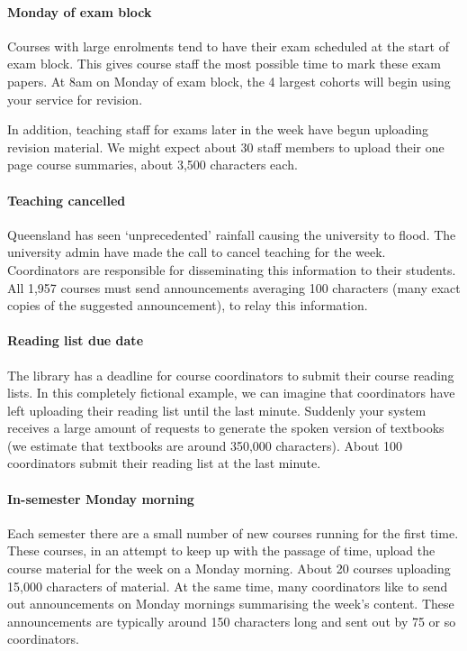 \documentclass{csse4400}
\begin{document}
\paragraph{Monday of exam block}
Courses with large enrolments tend to have their exam scheduled at the start of exam block.
This gives course staff the most possible time to mark these exam papers.
At 8am on Monday of exam block,
the 4 largest cohorts will begin using your service for revision.

In addition, teaching staff for exams later in the week have begun uploading revision material.
We might expect about 30 staff members to upload their one page course summaries,
about 3,500 characters each.

\paragraph{Teaching cancelled}
Queensland has seen `unprecedented' rainfall causing the university to flood.
The university admin have made the call to cancel teaching for the week.
Coordinators are responsible for disseminating this information to their students.
All 1,957 courses must send announcements averaging 100 characters (many exact copies of the suggested announcement),
to relay this information.

\paragraph{Reading list due date}
The library has a deadline for course coordinators to submit their course reading lists.
In this completely fictional example,
we can imagine that coordinators have left uploading their reading list until the last minute.
Suddenly your system receives a large amount of requests to generate the spoken version of textbooks (we estimate that textbooks are around 350,000 characters).
About 100 coordinators submit their reading list at the last minute.

\paragraph{In-semester Monday morning}
Each semester there are a small number of new courses running for the first time.
These courses, in an attempt to keep up with the passage of time,
upload the course material for the week on a Monday morning.
About 20 courses uploading 15,000 characters of material.
At the same time, many coordinators like to send out announcements on Monday mornings summarising the week's content.
These announcements are typically around 150 characters long and sent out by 75 or so coordinators.
\end{document}
